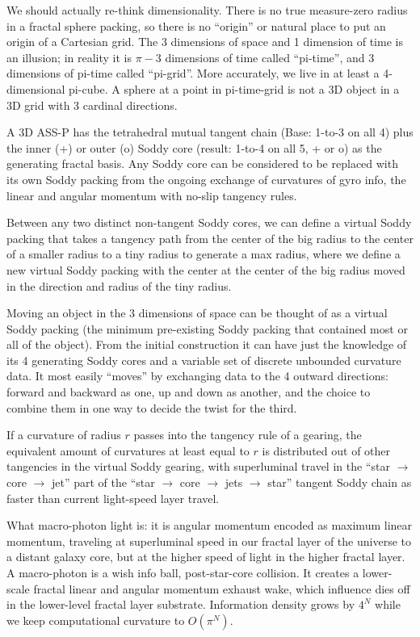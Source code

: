 \documentclass[11pt,a4paper]{article}
\begin{document}
    We should actually re-think dimensionality. There is no true measure-zero radius in a fractal sphere packing, so there is no ``origin'' or natural place to put an origin of a Cartesian grid. The 3 dimensions of space and 1 dimension of time is an illusion; in reality it is $\pi - 3$ dimensions of time called ``pi-time'', and 3 dimensions of pi-time called ``pi-grid''. More accurately, we live in at least a 4-dimensional pi-cube. A sphere at a point in pi-time-grid is not a 3D object in a 3D grid with 3 cardinal directions. 

    A 3D ASS-P has the tetrahedral mutual tangent chain (Base: 1-to-3 on all 4) plus the inner (+) or outer (o) Soddy core (result: 1-to-4 on all 5, + or o) as the generating fractal basis. Any Soddy core can be considered to be replaced with its own Soddy packing from the ongoing exchange of curvatures of gyro info, the linear and angular momentum with no-slip tangency rules. 

    Between any two distinct non-tangent Soddy cores, we can define a virtual Soddy packing that takes a tangency path from the center of the big radius to the center of a smaller radius to a tiny radius to generate a max radius, where we define a new virtual Soddy packing with the center at the center of the big radius moved in the direction and radius of the tiny radius.

    Moving an object in the 3 dimensions of space can be thought of as a virtual Soddy packing (the minimum pre-existing Soddy packing that contained most or all of the object). From the initial construction it can have just the knowledge of its 4 generating Soddy cores and a variable set of discrete unbounded curvature data. It most easily ``moves'' by exchanging data to the 4 outward directions: forward and backward as one, up and down as another, and the choice to combine them in one way to decide the twist for the third. 

    If a curvature of radius $r$ passes into the tangency rule of a gearing, the equivalent amount of curvatures at least equal to $r$ is distributed out of other tangencies in the virtual Soddy gearing, with superluminal travel in the ``star $\to$ core $\to$ jet'' part of the ``star $\to$ core $\to$ jets $\to$ star'' tangent Soddy chain as faster than current light-speed layer travel. 

    What macro-photon light is: it is angular momentum encoded as maximum linear momentum, traveling at superluminal speed in our fractal layer of the universe to a distant galaxy core, but at the higher speed of light in the higher fractal layer. A macro-photon is a wish info ball, post-star-core collision. It creates a lower-scale fractal linear and angular momentum exhaust wake, which influence dies off in the lower-level fractal layer substrate. Information density grows by $4^N$ while we keep computational curvature to $O(\pi^N)$. 
\end{document}
